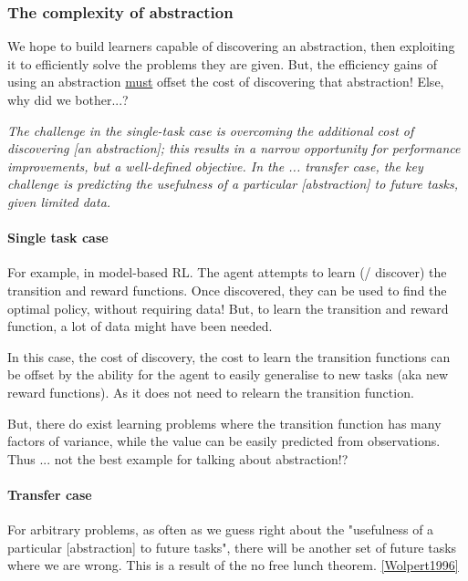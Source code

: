 \subsubsection{The complexity of abstraction}

We hope to build learners capable of discovering an abstraction,
then exploiting it to efficiently solve the problems they are given.
But, the efficiency gains of using an abstraction \underline{must} offset the cost of
discovering that abstraction! Else, why did we bother...?

\begin{displayquote}
\textit{The challenge in the single-task case is overcoming the additional cost of discovering [an abstraction];
this results in a narrow opportunity for performance improvements, but a well-defined objective.
In the ... transfer case, the key challenge is predicting the usefulness of a particular [abstraction] to future tasks, given limited data.}\cite{Konidaris2019}
\end{displayquote}

\paragraph{Single task case}

For example, in model-based RL. The agent attempts to learn (/ discover) the
transition and reward functions. Once discovered, they can be used to find the optimal policy, without requiring data!
But, to learn the transition and reward function, a lot of data might have been needed.

In this case, the cost of discovery, the cost to learn the transition functions can be offset
by the ability for the agent to easily generalise to new tasks (aka new reward functions).
As it does not need to relearn the transition function.

But, there do exist learning problems where the transition function has many
factors of variance, while the value can be easily predicted from observations.
Thus ...
{\color{red}not the best example for talking about abstraction!?}

\paragraph{Transfer case}

For arbitrary problems, as often as we guess right about the "usefulness of a particular [abstraction] to future tasks",
there will be another set of future tasks where we are wrong. This is a result of the
no free lunch theorem. \ref{Wolpert1996}

